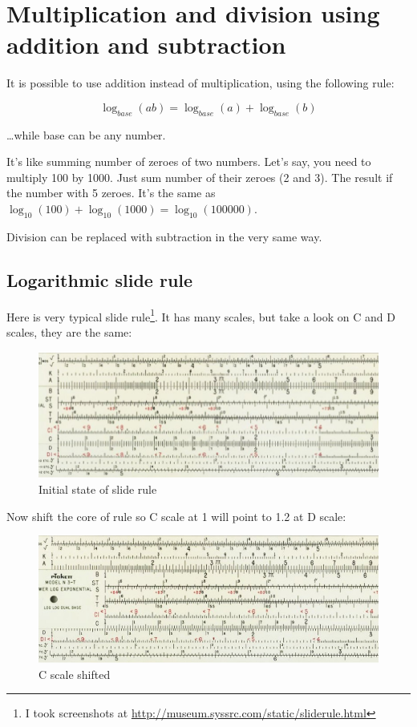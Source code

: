 \section{Multiplication and division using addition and subtraction}

It is possible to use addition instead of multiplication, using the following rule:

\begin{equation} \label{eq:1}
\log_{base} (ab) = \log_{base} (a) + \log_{base}(b)
\end{equation}

\dots while base can be any number.

It's like summing number of zeroes of two numbers. Let's say, you need to multiply 100 by 1000. Just sum number of their zeroes (2 and 3).
The result if the number with 5 zeroes. It's the same as $\log_{10} (100) + \log_{10} (1000) = \log_{10} (100000)$.

Division can be replaced with subtraction in the very same way.

\subsection{Logarithmic slide rule}

Here is very typical slide rule\footnote{I took screenshots at \url{http://museum.syssrc.com/static/sliderule.html}}.
It has many scales, but take a look on C and D scales, they are the same:

\begin{figure}[H]
\centering
\includegraphics[scale=0.66]{log/sliderule1.jpg}
\caption{Initial state of slide rule}
\end{figure}

Now shift the core of rule so C scale at 1 will point to 1.2 at D scale:

\begin{figure}[H]
\centering
\includegraphics[scale=0.66]{log/sliderule2.jpg}
\caption{C scale shifted}
\end{figure}

